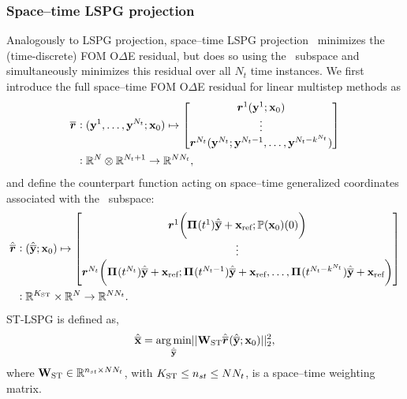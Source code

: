 \documentclass[3p,computermodern,10pt]{elsarticle}
\begin{document}
\subsubsection{Space--time LSPG projection}  
Analogously to LSPG projection, space--time LSPG projection~\cite{choi_stlspg}
minimizes the (time-discrete) FOM O$\Delta$E residual, but does so
using the \spaceTimeAcronym\ subspace and simultaneously minimizes this
residual over all $N_t$ time instances.
We first introduce the full space--time FOM O$\Delta$E residual for linear
multistep methods as
\begin{align*}
\overline{\boldsymbol r}_{} & \vcentcolon (\mathbf{y}^{1}, \ldots
	,\mathbf{y}^{N_t};{{\mathbf{x}}_0}) \mapsto \begin{bmatrix}
\boldsymbol r_{}^{1}(\mathbf{y}^{1}; {{\mathbf{x}}_0}) 
\\ 
\vdots \\
\boldsymbol r_{}^{N_t}(\mathbf{y}^{N_t};\mathbf{y}^{N_t-1},\ldots,\mathbf{y}^{N_t - k^{N_t}}) \end{bmatrix}  \\
& \vcentcolon \mathbb{R}^{N} \otimes \mathbb{R}^{N_t+1} \rightarrow \mathbb{R}^{N N_t},
\end{align*}
and define the counterpart function acting on space--time generalized
coordinates associated with the \spaceTimeAcronym\ subspace:
\begin{align*}
\hat{\overline{\boldsymbol r}}_{\text{}} & \vcentcolon (\hat{\mathbf{\overline{y}}} ;{{\mathbf{x}}_0}) \mapsto \begin{bmatrix}
\boldsymbol r_{}^{1}\bigg( \boldsymbol \Pi^{}(t^1)\hat{\mathbf{\overline{y}}} + \mathbf{x}_\text{ref}; \mathbb{P}({{\mathbf{x}}_0})(0) \bigg)
\\ 
\vdots \\
\boldsymbol r_{}^{N_t}\bigg( \boldsymbol \Pi^{}(t^{N_t})\hat{\mathbf{\overline{y}}} + \mathbf{x}_\text{ref}; \boldsymbol \Pi^{}(t^{N_t-1})\hat{\mathbf{\overline{y}}} + \mathbf{x}_\text{ref} ,\ldots,  \boldsymbol \Pi^{}(t^{N_t-k^{N_t}})\hat{\mathbf{\overline{y}}} + \mathbf{x}_\text{ref} \bigg)  \\ 
\end{bmatrix}  \\
& \vcentcolon \mathbb{R}^{K_{\text{ST}}} \times \mathbb{R}^{N} \rightarrow \mathbb{R}^{N N_t}. 
\end{align*}
ST-LSPG is defined as,
\begin{equation*}
\hat{\mathbf{\overline{x}}} = \underset{ \hat{\mathbf{\overline{y}}} }{\text{arg\,min}}|| \mathbf{W}_{\text{ST}}  \hat{\overline{\boldsymbol r}}_{\text{}}(\hat{\mathbf{\overline{y}}};{{\mathbf{x}}_0}) ||_2^2, 
\end{equation*}
where $\mathbf{W}_{\text{ST}} \in \mathbb{R}^{n_{st} \times N N_t}$, with $K_{\text{ST}} \le n_{st} \le N N_t$, is a space--time weighting matrix.
\end{document}
